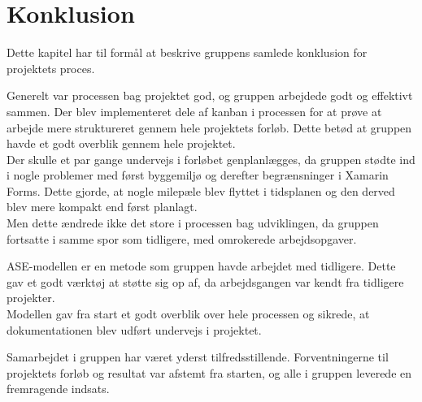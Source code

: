 \chapter{Konklusion}
Dette kapitel har til formål at beskrive gruppens samlede konklusion for projektets proces.

Generelt var processen bag projektet god, og gruppen arbejdede godt og effektivt sammen.
Der blev implementeret dele af kanban i processen for at prøve at arbejde mere struktureret gennem hele projektets forløb. Dette betød at gruppen havde et godt overblik gennem hele projektet. \\
Der skulle et par gange undervejs i forløbet genplanlægges, da gruppen stødte ind i nogle problemer med først byggemiljø og derefter begrænsninger i Xamarin Forms. Dette gjorde, at nogle milepæle blev flyttet i tidsplanen og den derved blev mere kompakt end først planlagt. \\
Men dette ændrede ikke det store i processen bag udviklingen, da gruppen fortsatte i samme spor som tidligere, med omrokerede arbejdsopgaver.

ASE-modellen er en metode som gruppen havde arbejdet med tidligere. Dette gav et godt værktøj at støtte sig op af, da arbejdsgangen var kendt fra tidligere projekter. \\
Modellen gav fra start et godt overblik over hele processen og sikrede, at dokumentationen blev udført undervejs i projektet.

Samarbejdet i gruppen har været yderst tilfredsstillende. Forventningerne til projektets forløb og resultat var afstemt fra starten, og alle i gruppen leverede en fremragende indsats.